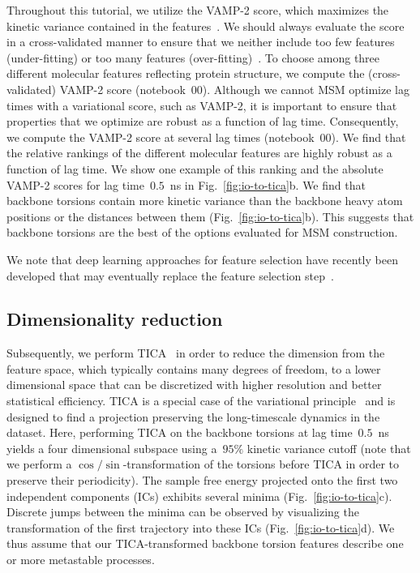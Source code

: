 \documentclass[9pt,tutorial]{livecoms}
\begin{document}
Throughout this tutorial, we utilize the VAMP-2 score, which maximizes the kinetic variance contained in the features~\cite{kinetic-maps}.
We should always evaluate the score in a cross-validated manner to ensure that we neither include too few features (under-fitting) or too many features (over-fitting)~\cite{gmrq,vamp-preprint}.
To choose among three different molecular features reflecting protein structure,
we compute the (cross-validated) VAMP-2 score (notebook~00).
Although we cannot MSM optimize lag times with a variational score\cite{husic2017note}, such as VAMP-2,
it is important to ensure that properties that we optimize are robust as a function of lag time. 
Consequently, we compute the VAMP-2 score at several lag times (notebook~00). 
We find that the relative rankings of the different molecular features are highly robust as a function of lag time. 
We show one example of this ranking and the absolute VAMP-2 scores for lag time~$0.5$~ns in Fig.~\ref{fig:io-to-tica}b. 
We find that backbone torsions contain more kinetic variance than the backbone heavy atom positions or the distances between them (Fig.~\ref{fig:io-to-tica}b).
This suggests that backbone torsions are the best of the options evaluated for MSM construction.

We note that deep learning approaches for feature selection have recently been developed that may eventually replace the feature selection step~\cite{vampnet,tae,hernandez-vde}.

\subsection{Dimensionality reduction}

Subsequently, we perform TICA~\cite{tica,tica3,kinetic-maps} in order to reduce the dimension from the feature space,
which typically contains many degrees of freedom,
to a lower dimensional space that can be discretized with higher resolution and better statistical efficiency.
TICA is a special case of the variational principle~\cite{noe-vac,nueske-vamk} and is designed to find a projection preserving the long-timescale dynamics in the dataset.
Here, performing TICA on the backbone torsions at lag time~$0.5$~ns yields a four dimensional subspace using a~$95\%$ kinetic variance cutoff
(note that we perform a $\cos/\sin$-transformation of the torsions before TICA in order to preserve their periodicity).
The sample free energy projected onto the first two independent components (ICs) exhibits several minima (Fig.~\ref{fig:io-to-tica}c).
Discrete jumps between the minima can be observed by visualizing the transformation of the first trajectory into these ICs (Fig.~\ref{fig:io-to-tica}d).
We thus assume that our TICA-transformed backbone torsion features describe one or more metastable processes.
\end{document}
